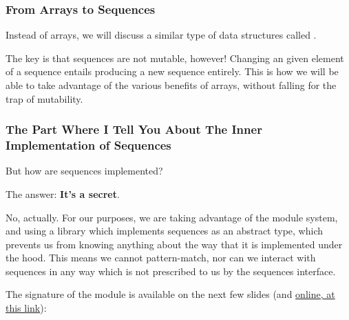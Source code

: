 \documentclass[aspectratio=169]{beamer}
\begin{document}
\begin{frame}[fragile]
  \frametitle{From Arrays to Sequences}

  \tgs

  Instead of arrays, we will discuss a similar type of data structures called
  .

  \pause
  \vspace{\fill}


  \pause
  \vspace{\fill}

  The key is that sequences are not mutable, however! Changing an given element of
  a sequence entails producing a new sequence entirely. This is how we will be able
  to take advantage of the various benefits of arrays, without falling for the
  trap of mutability.

  \pause
  \vspace{\fill}

\end{frame}

\begin{frame}[fragile]
  \frametitle{The Part Where I Tell You About The Inner Implementation of Sequences}

  But how are sequences implemented?

  \pause
  \vspace{\fill}

  The answer: \textbf{It's a secret}.

  \pause
  \vspace{\fill}

  No, actually. For our purposes, we are taking advantage of the module system,
  and using a library which implements sequences as an abstract type, which
  prevents us from knowing anything about the way that it is implemented under
  the hood. This means we cannot pattern-match, nor can we interact with
  sequences in any way which is not prescribed to us by the sequences interface.

  \vspace{\fill}

  The signature of the  module is available on the next few slides (and
  {\color{blue}\href{http://www.cs.cmu.edu/~15150/resources/libraries/sequence.pdf}{online, at this link}}):
\end{frame}
\end{document}
